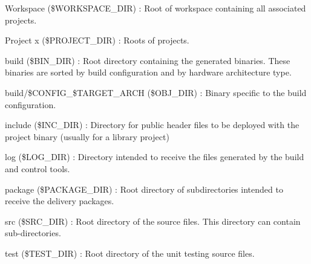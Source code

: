 \begin{DoxyItemize}
\item Workspace (\$\+W\+O\+R\+K\+S\+P\+A\+C\+E\+\_\+\+D\+I\+R) \+: Root of workspace containing all associated projects.
\item Project x (\$\+P\+R\+O\+J\+E\+C\+T\+\_\+\+D\+I\+R) \+: Roots of projects.
\item build (\$\+B\+I\+N\+\_\+\+D\+I\+R) \+: Root directory containing the generated binaries. These binaries are sorted by build configuration and by hardware architecture type.
\item build/\$\+C\+O\+N\+F\+I\+G\+\_\+\$\+T\+A\+R\+G\+E\+T\+\_\+\+A\+R\+C\+H (\$\+O\+B\+J\+\_\+\+D\+I\+R) \+: Binary specific to the build configuration.
\item include (\$\+I\+N\+C\+\_\+\+D\+I\+R) \+: Directory for public header files to be deployed with the project binary (usually for a library project)
\item log (\$\+L\+O\+G\+\_\+\+D\+I\+R) \+: Directory intended to receive the files generated by the build and control tools.
\item package (\$\+P\+A\+C\+K\+A\+G\+E\+\_\+\+D\+I\+R) \+: Root directory of subdirectories intended to receive the delivery packages.
\item src (\$\+S\+R\+C\+\_\+\+D\+I\+R) \+: Root directory of the source files. This directory can contain sub-\/directories.
\item test (\$\+T\+E\+S\+T\+\_\+\+D\+I\+R) \+: Root directory of the unit testing source files. 
\end{DoxyItemize}